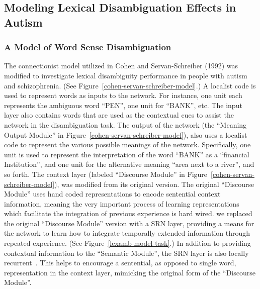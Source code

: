 \subsection{Modeling Lexical Disambiguation Effects in Autism}

\subsubsection{A Model of Word Sense Disambiguation}
The connectionist model utilized in Cohen and Servan-Schreiber (1992) was modified to investigate lexical disambiguity performance in people with autism and schizophrenia. (See Figure~\ref{cohen-servan-schreiber-model}.)  A localist code is used to represent words as inputs to the network.  For instance, one unit each represents the ambiguous word ``PEN'', one unit for ``BANK'', etc.  The input layer also contains words that are used as the contextual cues to assist the network in the disambiguation task.  The output of the network (the ``Meaning Output Module'' in Figure~\ref{cohen-servan-schreiber-model}), also uses a localist code to represent the various possible meanings of the network.  Specifically, one unit is used to represent the interpretation of the word ``BANK'' as a ``financial Institution'', and one unit for the alternative meaning ``area next to a river'', and so forth.  The context layer (labeled ``Discourse Module'' in Figure~\ref{cohen-servan-schreiber-model}), was modified from its original version.  The original ``Discourse Module'' uses hand coded representations to encode sentential context information, meaning the very important process of learning representations which facilitate the integration of previous experience is hard wired.  we replaced the original ``Discourse Module'' version with a SRN layer, providing a means for the network to learn how to integrate temporally extended information through repeated experience. (See Figure~\ref{lexamb-model-task}.) In addition to providing contextual information to the ``Semantic Module'', the SRN layer is also locally recurrent~\cite{JordanMI:1986:SRN}.  This helps to encourage a sentential, as opposed to single word, representation in the context layer, mimicking the original form of the ``Discourse Module''. 

